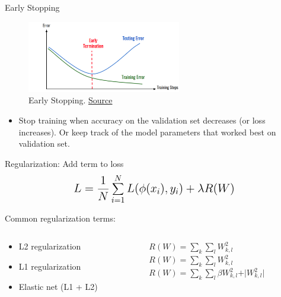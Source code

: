 \begin{frame}{Early Stopping}
\begin{figure}[H]
	\centering
	\includegraphics[width=0.6\textwidth]{Images/Early Stopping.png}
	\caption{Early Stopping. \href{https://medium.com/analytics-vidhya/early-stopping-with-pytorch-to-restrain-your-model-from-overfitting-dce6de4081c5}{Source}}
	\label{fig:Early Stopping}
\end{figure}
\begin{itemize}
\item Stop training when accuracy on the validation set decreases (or loss increases). Or keep track of the model parameters that worked best on validation set.
\end{itemize}
\end{frame}


\begin{frame}{Regularization: Add term to loss}
\begin{equation*}
\mathlarger{\mathlarger{L = \frac{1}{N} \sum_{i=1}^{N} L(\phi(x_i), y_i) + \lambda R(W)}}
\end{equation*}
\vspace{20pt}


Common regularization terms:
\begin{columns}
\begin{column}{0.5 \textwidth}
\begin{itemize}
\item L2 regularization
\item L1 regularization
\item Elastic net (L1 + L2)
\end{itemize}
\end{column}
\begin{column}{0.5 \textwidth}
$R(W)=\sum_{k}\sum_l W_{k,l}^2$ \\
$R(W)=\sum_{k}\sum_l W_{k,l}^2$\\
$R(W)=\sum_{k}\sum_l \beta W_{k,l}^2 + \vert W_{k,l}^2\vert$\\
\end{column}
\end{columns}
\end{frame}

